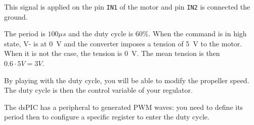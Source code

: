 \documentclass[11pt,a4paper]{article}
\theoremstyle{definition}%
\begin{document}
This signal is applied on the pin \texttt{IN1} of the motor and pin \texttt{IN2} is connected the ground.

The period is $100 \mu s$ and the duty cycle is $60\%$.
When the command is in high state, V- is at 0~V and the converter imposes a tension of 5~V to the motor.
When it is not the case, the tension is 0~V.
The mean tension is then $0.6 \cdot 5V  = 3 V$.

\begin{framed}
By playing with the duty cycle, you will be able to modify the propeller speed.
The duty cycle is then the control variable of your regulator.
\end{framed}

The dsPIC has a peripheral to generated PWM waves: you need to define its period then to configure a specific register to enter the duty cycle.
\end{document}
